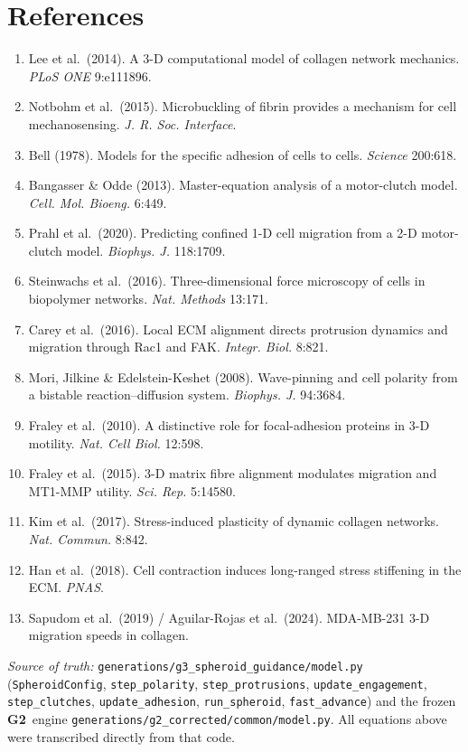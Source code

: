 \documentclass[11pt]{article}
\newcommand{\GTwo}{\textcolor{g2col}{\textbf{G2}}}
\newcommand{\code}[1]{\texttt{\small #1}}
\begin{document}
\section*{References}
\small
\begin{enumerate}[leftmargin=1.6em,itemsep=1pt]
  \item Lee et al.\ (2014). A 3-D computational model of collagen network mechanics. \emph{PLoS ONE} 9:e111896.
  \item Notbohm et al.\ (2015). Microbuckling of fibrin provides a mechanism for cell mechanosensing. \emph{J. R. Soc. Interface}.
  \item Bell (1978). Models for the specific adhesion of cells to cells. \emph{Science} 200:618.
  \item Bangasser \& Odde (2013). Master-equation analysis of a motor-clutch model. \emph{Cell. Mol. Bioeng.} 6:449.
  \item Prahl et al.\ (2020). Predicting confined 1-D cell migration from a 2-D motor-clutch model. \emph{Biophys. J.} 118:1709.
  \item Steinwachs et al.\ (2016). Three-dimensional force microscopy of cells in biopolymer networks. \emph{Nat. Methods} 13:171.
  \item Carey et al.\ (2016). Local ECM alignment directs protrusion dynamics and migration through Rac1 and FAK. \emph{Integr. Biol.} 8:821.
  \item Mori, Jilkine \& Edelstein-Keshet (2008). Wave-pinning and cell polarity from a bistable reaction--diffusion system. \emph{Biophys. J.} 94:3684.
  \item Fraley et al.\ (2010). A distinctive role for focal-adhesion proteins in 3-D motility. \emph{Nat. Cell Biol.} 12:598.
  \item Fraley et al.\ (2015). 3-D matrix fibre alignment modulates migration and MT1-MMP utility. \emph{Sci. Rep.} 5:14580.
  \item Kim et al.\ (2017). Stress-induced plasticity of dynamic collagen networks. \emph{Nat. Commun.} 8:842.
  \item Han et al.\ (2018). Cell contraction induces long-ranged stress stiffening in the ECM. \emph{PNAS}.
  \item Sapudom et al.\ (2019) / Aguilar-Rojas et al.\ (2024). MDA-MB-231 3-D migration speeds in collagen.
\end{enumerate}
\normalsize

\vfill
\noindent\footnotesize\emph{Source of truth:} \code{generations/g3\_spheroid\_guidance/model.py}
(\code{SpheroidConfig}, \code{step\_polarity}, \code{step\_protrusions}, \code{update\_engagement},
\code{step\_clutches}, \code{update\_adhesion}, \code{run\_spheroid}, \code{fast\_advance}) and the
frozen \GTwo\ engine \code{generations/g2\_corrected/common/model.py}. All equations above were
transcribed directly from that code.
\end{document}
